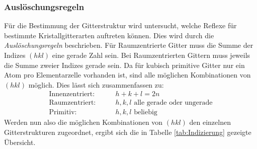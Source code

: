 \documentclass[a4paper,twoside,final]{article}
\begin{document}
\subsubsection{Auslöschungsregeln}\label{sec:Auslöschungsregeln}
Für die Bestimmung der Gitterstruktur wird untersucht, welche Reflexe für bestimmte Kristallgitterarten auftreten können. Dies wird durch die \textit{Auslöschungsregeln} beschrieben. Für Raumzentrierte Gitter muss die Summe der Indizes $(hkl)$ eine gerade Zahl sein. Bei Raumzentrierten Gittern muss jeweils die Summe zweier Indizes gerade sein. Da für kubisch primitive Gitter nur ein Atom pro Elementarzelle vorhanden ist, sind alle möglichen Kombinationen von $(hkl)$ möglich. Dies lässt sich zusammenfassen zu:
\begin{align}
  \text{Innenzentriert:} & \qquad h + k +l = 2n\nonumber\\
  \text{Raumzentriert:}  & \qquad h, k, l \text{ alle gerade oder ungerade}\\
  \text{Primitiv:} & \qquad h, k, l \text{ beliebig}\nonumber
\end{align}
Werden nun also die möglichen Kombinationen von $(hkl)$ den einzelnen Gitterstrukturen zugeordnet, ergibt sich die in Tabelle \ref{tab:Indizierung} gezeigte Übersicht.
\end{document}
